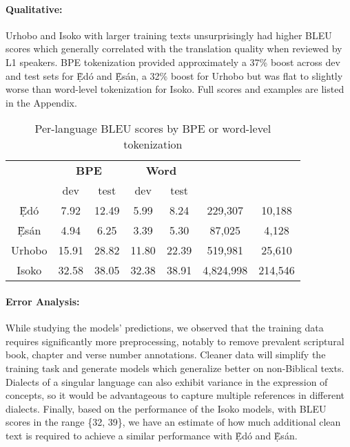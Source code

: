 \documentclass{article} %
\begin{document}
\paragraph{Qualitative:} Urhobo and Isoko with larger training texts unsurprisingly had higher BLEU scores which generally correlated with the translation quality when reviewed by L1 speakers. BPE tokenization provided approximately a 37\% boost across dev and test sets for \d{\`E}d{\'o} and \d{\`E}s{\'a}n, a 32\% boost for Urhobo but was flat to slightly worse than word-level tokenization for Isoko. Full scores and examples are listed in the Appendix.

\begin{table}[h]
\caption{Per-language BLEU scores by BPE or word-level tokenization}
\label{results}
\begin{center}
\begin{tabular}{c@{\qquad}ccc@{\qquad}ccc}
  \toprule
  \multirow{2}{*}{\raisebox{-\heavyrulewidth}{\textbf{Language}}} & \multicolumn{2}{c}{\textbf{BPE}} & \multicolumn{2}{c}{\textbf{Word}} & \multirow{2}{*}{\raisebox{-\heavyrulewidth}{\textbf{Tokens}}} & \multirow{2}{*}{\raisebox{-\heavyrulewidth}{\textbf{Sentences}}}
  	 \\
  \cmidrule{2-5}
  & dev & test & dev & test \\
  \midrule
  \d{\`E}d{\'o}  & 7.92 & 12.49 & 5.99 & 8.24 &  229,307 & 10,188 \\
  \d{\`E}s{\'a}n & 4.94 & 6.25 & 3.39 & 5.30 & 87,025 & 4,128 \\
    \midrule
  Urhobo  & 15.91 & 28.82 & 11.80 & 22.39 & 519,981 & 25,610 \\
  Isoko   & 32.58 & 38.05 & 32.38 & 38.91 & 4,824,998 & 214,546 \\
  \bottomrule
  \end{tabular}
\end{center}
\end{table}

\paragraph{Error Analysis:} While studying the models' predictions, we observed that the training data requires significantly more preprocessing, notably to remove prevalent scriptural book, chapter and verse number annotations. Cleaner data will simplify the training task and generate models which generalize better on non-Biblical texts. Dialects of a singular language can also exhibit variance in the expression of concepts, so it would be advantageous to capture multiple references in different dialects. Finally, based on the performance of the Isoko models, with BLEU scores in the range \{32, 39\}, we have an estimate of how much additional clean text is required to achieve a similar performance with \d{\`E}d{\'o} and \d{\`E}s{\'a}n.
\end{document}
